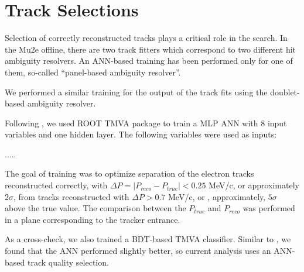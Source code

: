 
\section{Track Selections}

Selection of correctly reconstructed tracks plays a critical role in the search.
In the Mu2e offline, there are two track fitters which correspond to two different
hit ambiguity resolvers. An ANN-based training has been performed only for one of them,
so-called ``panel-based ambiguity resolver''.

We performed a similar training for the output of the track fits using the doublet-based
ambiguity resolver.

Following \cite{MU2E_4595_ANN_TRAINING}, we used ROOT TMVA package to train a MLP ANN
with 8 input variables and one hidden layer. The following variables were used as inputs:

.....

The goal of training was to optimize separation of the electron tracks reconstructed correctly,
with $\Delta{P} = |P_{reco}-P_{true}| < 0.25$ MeV/c, or approximately $2\sigma$, from tracks
reconstructed with $\Delta{P} > 0.7$ MeV/c, or , approximately, $5\sigma$ above the true value.
The comparison between the $P_{true}$ and $P_{reco}$ was performed in a plane corresponding to
the tracker entrance. 

As a cross-check, we also trained a BDT-based TMVA classifier. Similar to \cite{MU2E_33150_ANN_TRAINING},
we found that the ANN performed slightly better, so current analysis uses an ANN-based track
quality selection.

